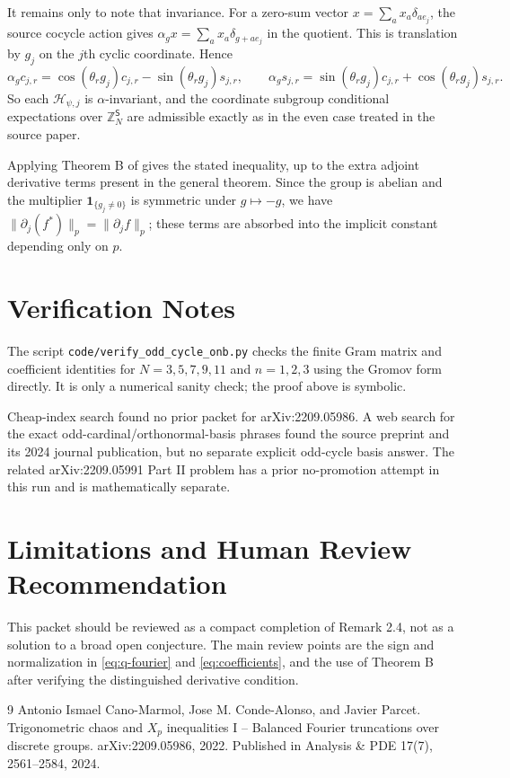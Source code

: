\documentclass[11pt]{article}
\newcommand{\Z}{\mathbb Z}
\newcommand{\Hcal}{\mathcal H}
\newcommand{\Ss}{\mathsf S}
\newcommand{\one}{\mathbf 1}
\begin{document}
It remains only to note that invariance.  For a zero-sum vector
$x=\sum_a x_a\delta_{ae_j}$, the source cocycle action gives
$\alpha_g x=\sum_a x_a\delta_{g+ae_j}$ in the quotient.  This is translation
by $g_j$ on the $j$th cyclic coordinate.  Hence
\[
  \alpha_g c_{j,r}
  =\cos(\theta_r g_j)c_{j,r}-\sin(\theta_r g_j)s_{j,r},
  \qquad
  \alpha_g s_{j,r}
  =\sin(\theta_r g_j)c_{j,r}+\cos(\theta_r g_j)s_{j,r}.
\]
So each $\Hcal_{\psi,j}$ is $\alpha$-invariant, and the coordinate subgroup
conditional expectations over $\Z_N^\Ss$ are admissible exactly as in the even
case treated in the source paper.

Applying Theorem B of \cite{CCP2022} gives the stated inequality, up to the
extra adjoint derivative terms present in the general theorem.  Since the
group is abelian and the multiplier $\one_{\{g_j\ne0\}}$ is symmetric under
$g\mapsto -g$, we have $\|\partial_j(f^*)\|_p=\|\partial_j f\|_p$; these terms
are absorbed into the implicit constant depending only on $p$.

\section*{Verification Notes}

The script \texttt{code/verify\_odd\_cycle\_onb.py} checks the finite Gram
matrix and coefficient identities for $N=3,5,7,9,11$ and $n=1,2,3$ using the
Gromov form directly.  It is only a numerical sanity check; the proof above is
symbolic.

Cheap-index search found no prior packet for arXiv:2209.05986.  A web search
for the exact odd-cardinal/orthonormal-basis phrases found the source preprint
and its 2024 journal publication, but no separate explicit odd-cycle basis
answer.  The related arXiv:2209.05991 Part II problem has a prior no-promotion
attempt in this run and is mathematically separate.

\section*{Limitations and Human Review Recommendation}

This packet should be reviewed as a compact completion of Remark 2.4, not as a
solution to a broad open conjecture.  The main review points are the sign and
normalization in \eqref{eq:q-fourier} and \eqref{eq:coefficients}, and the
use of Theorem B after verifying the distinguished derivative condition.

\begin{thebibliography}{9}
Antonio Ismael Cano-Marmol, Jose M. Conde-Alonso, and Javier Parcet.
\newblock Trigonometric chaos and {$X_p$} inequalities I -- Balanced Fourier
truncations over discrete groups.
\newblock arXiv:2209.05986, 2022. Published in Analysis \& PDE 17(7),
2561--2584, 2024.
\end{thebibliography}
\end{document}
